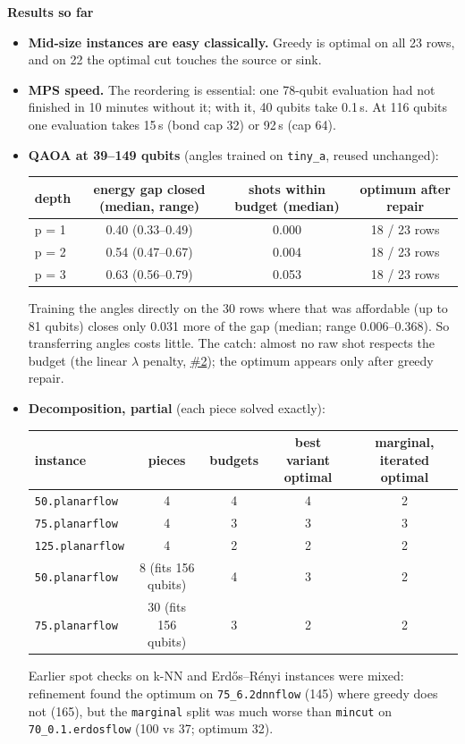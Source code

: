 \documentclass[10.5pt]{article}
\newcommand{\keeplines}[1]{\par\vskip 0pt plus #1\baselineskip\penalty-250\vskip 0pt plus -#1\baselineskip}
\newcommand{\field}[1]{\keeplines{3}\textbf{#1}\quad}
\newcommand{\iss}[1]{\href{https://github.com/anurag-r20/Network-Interdiction/issues/#1}{\##1}}
\newcommand{\f}[1]{\texttt{#1}}
\begin{document}
\field{Results so far}
\begin{itemize}
\item \textbf{Mid-size instances are easy classically.} Greedy is optimal on all 23 rows, and on 22 the optimal cut touches the source or sink.
\item \textbf{MPS speed.} The reordering is essential: one 78-qubit evaluation had not finished in 10 minutes without it; with it, 40 qubits take 0.1\,s. At 116 qubits one evaluation takes 15\,s (bond cap 32) or 92\,s (cap 64).
\item \textbf{QAOA at 39--149 qubits} (angles trained on \f{tiny\_a}, reused unchanged):
\begin{center}\small
\begin{tabular}{@{}lccc@{}}
\toprule
depth & energy gap closed (median, range) & shots within budget (median) & optimum after repair \\
\midrule
p = 1 & 0.40 (0.33--0.49) & 0.000 & 18 / 23 rows \\
p = 2 & 0.54 (0.47--0.67) & 0.004 & 18 / 23 rows \\
p = 3 & 0.63 (0.56--0.79) & 0.053 & 18 / 23 rows \\
\bottomrule
\end{tabular}
\end{center}
Training the angles directly on the 30 rows where that was affordable (up to 81 qubits) closes only 0.031 more of the gap (median; range 0.006--0.368). So transferring angles costs little. The catch: almost no raw shot respects the budget (the linear $\lambda$ penalty, \iss{2}); the optimum appears only after greedy repair.
\item \textbf{Decomposition, partial} (each piece solved exactly):
\begin{center}\small
\begin{tabular}{@{}lcccc@{}}
\toprule
instance & pieces & budgets & best variant optimal & marginal, iterated optimal \\
\midrule
\f{50.planarflow} & 4 & 4 & 4 & 2 \\
\f{75.planarflow} & 4 & 3 & 3 & 3 \\
\f{125.planarflow} & 4 & 2 & 2 & 2 \\
\f{50.planarflow} & 8 (fits 156 qubits) & 4 & 3 & 2 \\
\f{75.planarflow} & 30 (fits 156 qubits) & 3 & 2 & 2 \\
\bottomrule
\end{tabular}
\end{center}
Earlier spot checks on k-NN and Erd\H{o}s--R\'enyi instances were mixed: refinement found the optimum on \f{75\_6.2dnnflow} (145) where greedy does not (165), but the \f{marginal} split was much worse than \f{mincut} on \f{70\_0.1.erdosflow} (100 vs 37; optimum 32).
\end{itemize}
\end{document}
